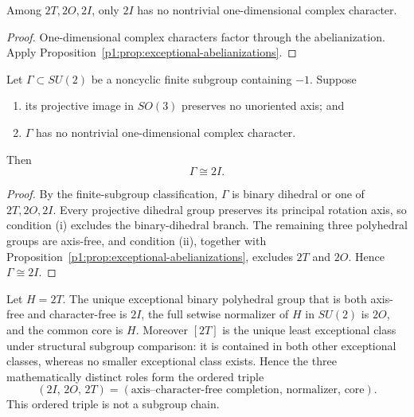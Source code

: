 \documentclass[11pt]{article}
\begin{document}
\begin{corollary}
\label{p1:cor:character-free-exceptional}
Among \(2T,2O,2I\), only \(2I\) has no nontrivial one-dimensional complex
character.
\end{corollary}

\begin{proof}
One-dimensional complex characters factor through the abelianization.  Apply
Proposition~\ref{p1:prop:exceptional-abelianizations}.
\end{proof}

\begin{theorem}
\label{p1:thm:axis-character-free-selector}
Let \(\Gamma\subset SU(2)\) be a noncyclic finite subgroup containing
\(-1\).  Suppose
\begin{enumerate}[label=(\roman*)]
    \item its projective image in \(SO(3)\) preserves no unoriented axis; and
    \item \(\Gamma\) has no nontrivial one-dimensional complex character.
\end{enumerate}
Then
\[
    \Gamma\cong2I.
\]
\end{theorem}

\begin{proof}
By the finite-subgroup classification, \(\Gamma\) is binary dihedral or one of
\(2T,2O,2I\).  Every projective dihedral group preserves its principal rotation
axis, so condition (i) excludes the binary-dihedral branch.  The remaining three
polyhedral groups are axis-free, and condition (ii), together with
Proposition~\ref{p1:prop:exceptional-abelianizations}, excludes \(2T\) and
\(2O\).  Hence \(\Gamma\cong2I\).
\end{proof}

\begin{corollary}
\label{p1:cor:conditional-exceptional-role-order}
Let \(H=2T\).  The unique exceptional binary polyhedral group that is both
axis-free and character-free is \(2I\), the full setwise normalizer of \(H\) in
\(SU(2)\) is \(2O\), and the common core is \(H\).  Moreover \([2T]\) is the
unique least exceptional class under structural subgroup comparison: it is
contained in both other exceptional classes, whereas no smaller exceptional
class exists.  Hence the three mathematically distinct roles form the ordered
triple
\[
    (2I,\,2O,\,2T)
    =
    (\text{axis--character-free completion},\,
     \text{normalizer},\,
     \text{core}).
\]
This ordered triple is not a subgroup chain.
\end{corollary}
\end{document}
